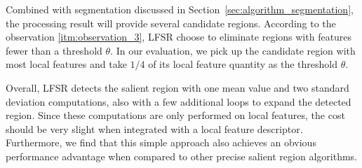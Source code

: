 Combined with segmentation discussed in Section~\ref{sec:algorithm_segmentation}, the processing result will provide several candidate regions. According to the observation \ref{itm:observation_3}, LFSR choose to eliminate regions with features fewer than a threshold $\theta$. In our evaluation, we pick up the candidate region with most local features and take $1/4$ of its local feature quantity as the threshold $\theta$.

Overall, LFSR detects the salient region with one mean value and two standard deviation computations, also with a few additional loops to expand the detected region. Since these computations are only performed on local features, the cost should be very slight when integrated with a local feature descriptor. Furthermore, we find that this simple approach also achieves an obvious performance advantage when compared to other precise salient region algorithms.